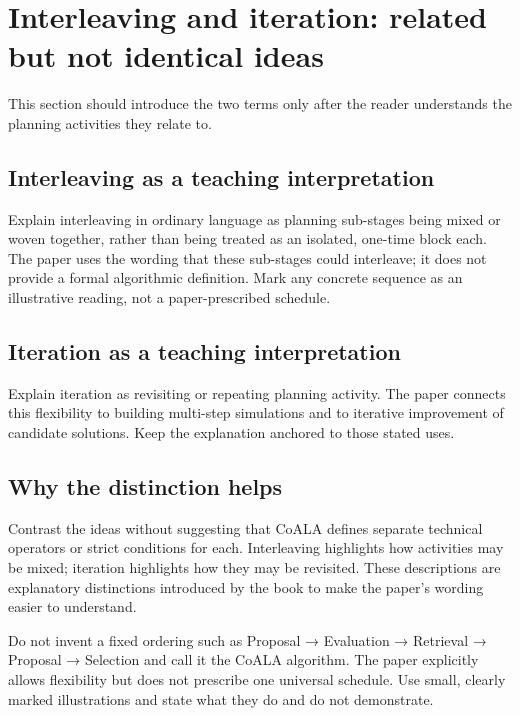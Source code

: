 \section{Interleaving and iteration: related but not identical ideas}
This section should introduce the two terms only after the reader understands the planning activities they relate to.
\subsection{Interleaving as a teaching interpretation}
Explain interleaving in ordinary language as planning sub-stages being mixed or woven together, rather than being treated as an isolated, one-time block each. The paper uses the wording that these sub-stages could interleave; it does not provide a formal algorithmic definition. Mark any concrete sequence as an illustrative reading, not a paper-prescribed schedule.
\subsection{Iteration as a teaching interpretation}
Explain iteration as revisiting or repeating planning activity. The paper connects this flexibility to building multi-step simulations and to iterative improvement of candidate solutions. Keep the explanation anchored to those stated uses.
\subsection{Why the distinction helps}
Contrast the ideas without suggesting that CoALA defines separate technical operators or strict conditions for each. Interleaving highlights how activities may be mixed; iteration highlights how they may be revisited. These descriptions are explanatory distinctions introduced by the book to make the paper's wording easier to understand.
\begin{warningbox}
Do not invent a fixed ordering such as Proposal → Evaluation → Retrieval → Proposal → Selection and call it the CoALA algorithm. The paper explicitly allows flexibility but does not prescribe one universal schedule. Use small, clearly marked illustrations and state what they do and do not demonstrate.
\end{warningbox}

